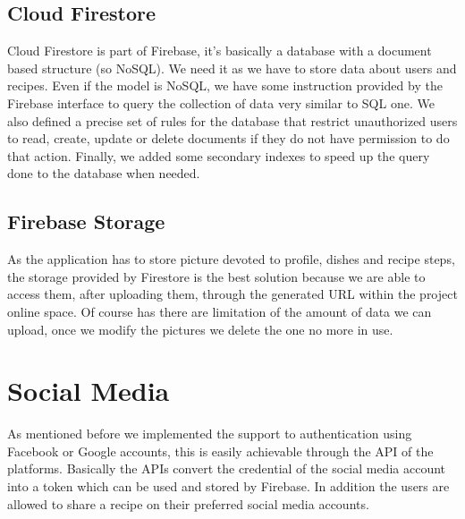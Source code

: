 \subsection{Cloud Firestore}
Cloud Firestore is part of Firebase, it's basically a database with a document based structure (so NoSQL).
We need it as we have to store data about users and recipes.
Even if the model is NoSQL, we have some instruction provided by the Firebase interface to query the collection of data very similar to SQL one.
We also defined a precise set of rules for the database that restrict unauthorized users to read, create, update or delete documents if they do not have permission to do that action.
Finally, we added some secondary indexes to speed up the query done to the database when needed.

\subsection{Firebase Storage}
As the application has to store picture devoted to profile, dishes and recipe steps, the storage provided by Firestore is the best solution because we are able to access them, after uploading them, through the generated URL within the project online space. 
Of course has there are limitation of the amount of data we can upload, once we modify the pictures we delete the one no more in use.

\section{Social Media}
As mentioned before we implemented the support to authentication using Facebook or Google accounts, this is easily achievable through the API of the platforms.
Basically the APIs convert the credential of the social media account into a token which can be used and stored by Firebase. 
In addition the users are allowed to share a recipe on their preferred social media accounts.
